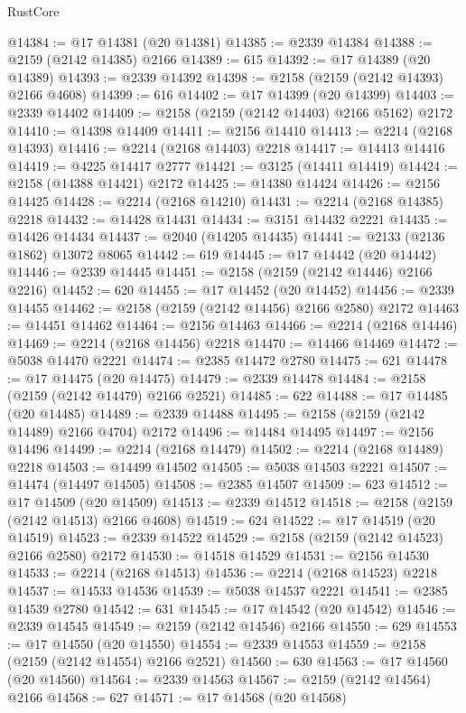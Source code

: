 \begin{lexlean}{RustCore}
\begin{coremodule}
@14384 := @17 @14381 (@20 @14381)
@14385 := @2339 @14384
@14388 := @2159 (@2142 @14385) @2166
@14389 := 615
@14392 := @17 @14389 (@20 @14389)
@14393 := @2339 @14392
@14398 := @2158 (@2159 (@2142 @14393) @2166 @4608)
@14399 := 616
@14402 := @17 @14399 (@20 @14399)
@14403 := @2339 @14402
@14409 := @2158 (@2159 (@2142 @14403) @2166 @5162) @2172
@14410 := @14398 @14409
@14411 := @2156 @14410
@14413 := @2214 (@2168 @14393)
@14416 := @2214 (@2168 @14403) @2218
@14417 := @14413 @14416
@14419 := @4225 @14417 @2777
@14421 := @3125 (@14411 @14419)
@14424 := @2158 (@14388 @14421) @2172
@14425 := @14380 @14424
@14426 := @2156 @14425
@14428 := @2214 (@2168 @14210)
@14431 := @2214 (@2168 @14385) @2218
@14432 := @14428 @14431
@14434 := @3151 @14432 @2221
@14435 := @14426 @14434
@14437 := @2040 (@14205 @14435)
@14441 := @2133 (@2136 @1862) @13072 @8065
@14442 := 619
@14445 := @17 @14442 (@20 @14442)
@14446 := @2339 @14445
@14451 := @2158 (@2159 (@2142 @14446) @2166 @2216)
@14452 := 620
@14455 := @17 @14452 (@20 @14452)
@14456 := @2339 @14455
@14462 := @2158 (@2159 (@2142 @14456) @2166 @2580) @2172
@14463 := @14451 @14462
@14464 := @2156 @14463
@14466 := @2214 (@2168 @14446)
@14469 := @2214 (@2168 @14456) @2218
@14470 := @14466 @14469
@14472 := @5038 @14470 @2221
@14474 := @2385 @14472 @2780
@14475 := 621
@14478 := @17 @14475 (@20 @14475)
@14479 := @2339 @14478
@14484 := @2158 (@2159 (@2142 @14479) @2166 @2521)
@14485 := 622
@14488 := @17 @14485 (@20 @14485)
@14489 := @2339 @14488
@14495 := @2158 (@2159 (@2142 @14489) @2166 @4704) @2172
@14496 := @14484 @14495
@14497 := @2156 @14496
@14499 := @2214 (@2168 @14479)
@14502 := @2214 (@2168 @14489) @2218
@14503 := @14499 @14502
@14505 := @5038 @14503 @2221
@14507 := @14474 (@14497 @14505)
@14508 := @2385 @14507
@14509 := 623
@14512 := @17 @14509 (@20 @14509)
@14513 := @2339 @14512
@14518 := @2158 (@2159 (@2142 @14513) @2166 @4608)
@14519 := 624
@14522 := @17 @14519 (@20 @14519)
@14523 := @2339 @14522
@14529 := @2158 (@2159 (@2142 @14523) @2166 @2580) @2172
@14530 := @14518 @14529
@14531 := @2156 @14530
@14533 := @2214 (@2168 @14513)
@14536 := @2214 (@2168 @14523) @2218
@14537 := @14533 @14536
@14539 := @5038 @14537 @2221
@14541 := @2385 @14539 @2780
@14542 := 631
@14545 := @17 @14542 (@20 @14542)
@14546 := @2339 @14545
@14549 := @2159 (@2142 @14546) @2166
@14550 := 629
@14553 := @17 @14550 (@20 @14550)
@14554 := @2339 @14553
@14559 := @2158 (@2159 (@2142 @14554) @2166 @2521)
@14560 := 630
@14563 := @17 @14560 (@20 @14560)
@14564 := @2339 @14563
@14567 := @2159 (@2142 @14564) @2166
@14568 := 627
@14571 := @17 @14568 (@20 @14568)

\end{coremodule}
\end{lexlean}
